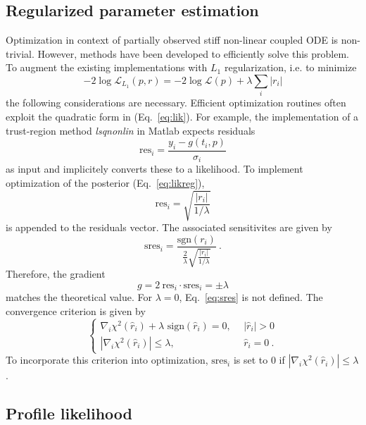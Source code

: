 \documentclass{bioinfo}
\begin{document}
\subsection{Regularized parameter estimation}
Optimization in context of partially observed stiff non-linear coupled ODE is non-trivial.
However, methods have been developed to efficiently solve this problem.
To augment the existing implementations with $L_1$ regularization, i.e. to minimize
\begin{equation}
	-2\log \mathcal L_{L_1}(p,r) = -2\log \mathcal L(p) + \lambda \sum_i |r_i|
\end{equation}
the following considerations are necessary.
Efficient optimization routines often exploit the quadratic form in (Eq.~\ref{eq:lik}).
For example, the implementation of a trust-region method \textit{lsqnonlin} in Matlab expects residuals
\begin{equation}
	\text{res}_i = \frac{y_i-g(t_i,p)}{\sigma_i}
\end{equation}
as input and implicitely converts these to a likelihood.
To implement optimization of the posterior (Eq.~\ref{eq:likreg}),
\begin{equation}
	\text{res}_i = \sqrt{\frac{|r_i|}{1/\lambda}}
\end{equation}
is appended to the residuals vector.
The associated sensitivites are given by
\begin{equation}
	\text{sres}_i = \frac{\text{sgn}(r_i)}{\frac{2}{\lambda}\sqrt{\frac{|r_i|}{1/\lambda}}} \:.\label{eq:sres}
\end{equation}
Therefore, the gradient
\begin{equation}
	g = 2 \: \text{res}_i \cdot \text{sres}_i = \pm \lambda
\end{equation}
matches the theoretical value.
For $\lambda = 0$, Eq.~\ref{eq:sres} is not defined.
The convergence criterion is given by
\begin{equation}
	\begin{cases}
	\nabla_i \chi^2(\hat r_i) + \lambda \text{ sign}(\hat r_i) = 0, \:\:& |\hat r_i| > 0\\
	|\nabla_i \chi^2(\hat r_i)| \le \lambda, \:\:&\hat r_i = 0 \:.
	\end{cases}
\end{equation}
To incorporate this criterion into optimization, $\text{sres}_i$ is set to $0$ if $|\nabla_i \chi^2(\hat r_i)| \le \lambda$.\\

\subsection{Profile likelihood}
\end{document}
